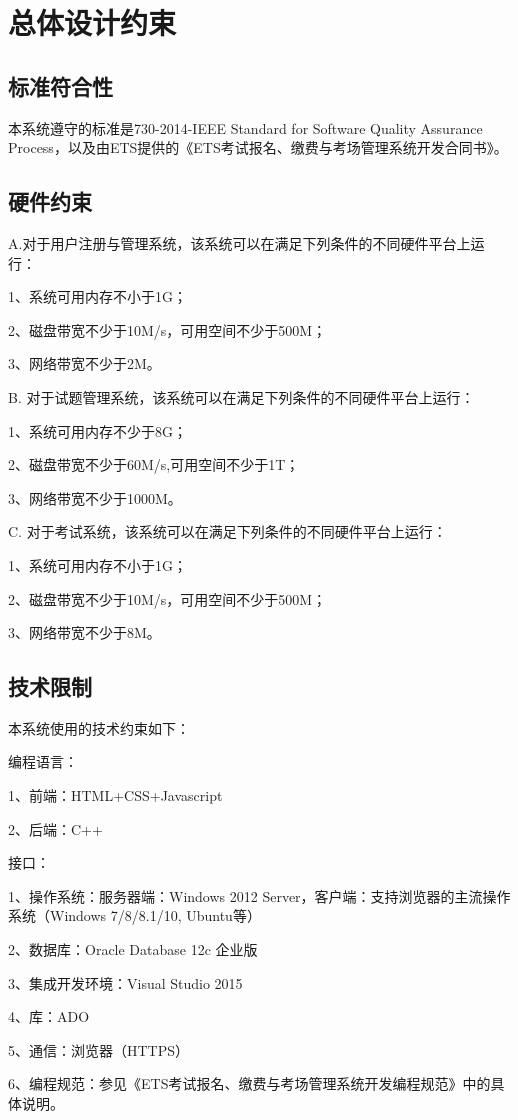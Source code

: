\chapter{总体设计约束}
 
\section{标准符合性}
本系统遵守的标准是730-2014-IEEE Standard for Software Quality Assurance Process，以及由ETS提供的《ETS考试报名、缴费与考场管理系统开发合同书》。

\section{硬件约束}
A.对于用户注册与管理系统，该系统可以在满足下列条件的不同硬件平台上运行：

1、系统可用内存不小于1G；

2、磁盘带宽不少于10M/s，可用空间不少于500M；

3、网络带宽不少于2M。

B. 对于试题管理系统，该系统可以在满足下列条件的不同硬件平台上运行：

1、系统可用内存不少于8G；

2、磁盘带宽不少于60M/s,可用空间不少于1T；

3、网络带宽不少于1000M。

C. 对于考试系统，该系统可以在满足下列条件的不同硬件平台上运行：

1、系统可用内存不小于1G；

2、磁盘带宽不少于10M/s，可用空间不少于500M；

3、网络带宽不少于8M。

\section{技术限制}
本系统使用的技术约束如下：

编程语言：

1、前端：HTML+CSS+Javascript

2、后端：C++

接口：

1、操作系统：服务器端：Windows 2012 Server，客户端：支持浏览器的主流操作系统（Windows 7/8/8.1/10, Ubuntu等）
	
2、数据库：Oracle Database 12c 企业版
	
3、集成开发环境：Visual Studio 2015
	
4、库：ADO
	
5、通信：浏览器（HTTPS）
	
6、编程规范：参见《ETS考试报名、缴费与考场管理系统开发编程规范》中的具体说明。
